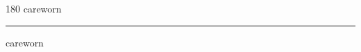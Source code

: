 
\begin{frame}
\begin{center}
\begin{turn}{180}
{\fontsize{2.5cm}{1em}\selectfont careworn}
\end{turn}
\vspace{1em}\par  
\hrule
\vspace{1em}\par  
{\fontsize{2.5cm}{1em}\selectfont careworn}
\end{center}
\end{frame}

